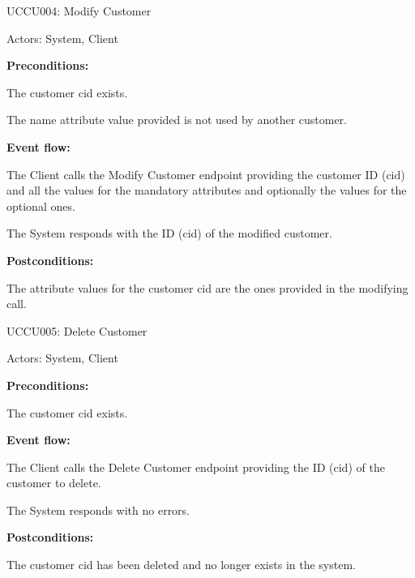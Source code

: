 \begin{ucbox}{UCCU004: Modify Customer}
\label{UCCU004}

Actors: System, Client

\textbf{Preconditions:}

\ucitem The customer cid exists.

\ucitem The name attribute value provided is not used by another customer.

\textbf{Event flow:}

\ucitem The Client calls the Modify Customer endpoint providing the customer ID (cid) and all the values for the mandatory attributes and optionally the values for the optional 
ones.

\ucitem The System responds with the ID (cid) of the modified customer.

\textbf{Postconditions:}

\ucitem The attribute values for the customer cid are the ones provided in the modifying call.

\end{ucbox}

\begin{ucbox}{UCCU005: Delete Customer}
\label{UCCU005}

Actors: System, Client

\textbf{Preconditions:}

\ucitem The customer cid exists.

\textbf{Event flow:}

\ucitem The Client calls the Delete Customer endpoint providing the ID (cid) of the customer to delete.

\ucitem The System responds with no errors.

\textbf{Postconditions:}

\ucitem The customer cid has been deleted and no longer exists in the system.

\end{ucbox}
\newpage